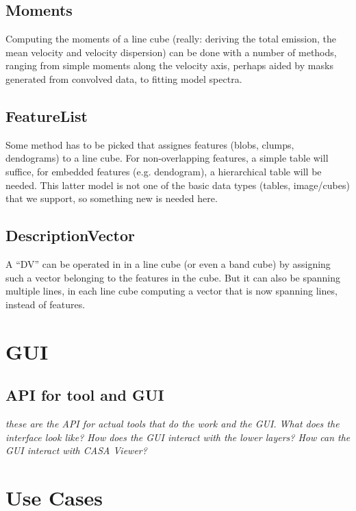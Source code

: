 \documentclass{article}
\begin{document}
\subsection{Moments}

Computing the moments of a line cube (really: deriving the total
emission, the mean velocity and velocity dispersion) can be done
with a number of methods, ranging from simple moments along the
velocity axis, perhaps aided by masks generated from convolved
data, to fitting model spectra.


\subsection{FeatureList}

Some method has to be picked that assignes features  (blobs, clumps, 
dendograms) to a line cube.  For non-overlapping features, a simple
table will suffice, for embedded features (e.g. dendogram),
a hierarchical table will be needed. This latter model is not one of
the basic data types (tables, image/cubes) that we support, so something
new is needed here.

\subsection{DescriptionVector}

A ``DV'' can be operated in in a line cube (or even a band cube) by assigning
such a vector belonging to the features in the cube. But it can also be
spanning multiple lines, in each line cube computing a vector that is now
spanning lines, instead of features.


\section{GUI}


\subsection{API for tool and GUI}

{\it these are the API for actual tools that do the
work and the GUI. What does the interface look like?
How does the GUI interact with the lower layers? How
can the GUI interact with CASA Viewer?}

\section{Use Cases}
\end{document}
